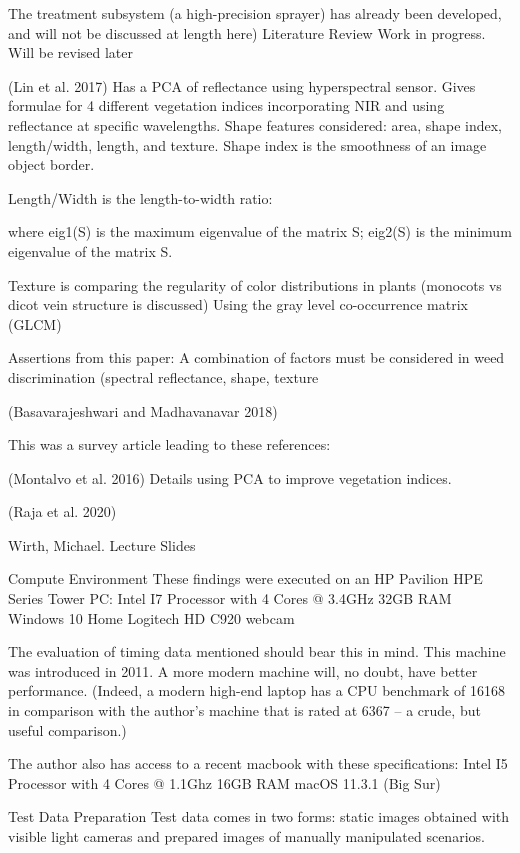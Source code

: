 \documentclass[letterpaper]{article}
\begin{document}
The treatment subsystem (a high-precision sprayer) has already been developed, and will not be discussed at length here)
Literature Review
Work in progress. Will be revised later

(Lin et al. 2017)
Has a PCA of reflectance using hyperspectral sensor.
Gives formulae for 4 different vegetation indices incorporating NIR and using reflectance at specific wavelengths.
Shape features considered: area, shape index, length/width, length, and texture. Shape index is the smoothness of an image object border.

Length/Width is the length-to-width ratio:




where eig1(S) is the maximum eigenvalue of the matrix S; eig2(S) is the minimum eigenvalue of the matrix S.

Texture is comparing the regularity of color distributions in plants  (monocots vs dicot vein structure is discussed) Using the gray level co-occurrence matrix (GLCM)


Assertions from this paper:
A combination of factors must be considered in weed discrimination (spectral reflectance, shape, texture

(Basavarajeshwari and Madhavanavar 2018)

This was a survey article leading to these references:

(Montalvo et al. 2016)
Details using PCA to improve vegetation indices.

(Raja et al. 2020)

Wirth, Michael. Lecture Slides

Compute Environment
These findings were executed on an HP Pavilion HPE Series Tower PC:
Intel I7 Processor with 4 Cores @ 3.4GHz
32GB RAM
Windows 10 Home
Logitech HD C920 webcam

The evaluation of timing data mentioned should bear this in mind. This machine was introduced in 2011. A more modern machine will, no doubt, have better performance. (Indeed, a modern high-end laptop has a CPU benchmark of 16168 in comparison with the author’s machine that is rated at 6367 -- a crude, but useful comparison.)

The author also has access to a recent macbook with these specifications:
Intel I5 Processor with 4 Cores @ 1.1Ghz
16GB RAM
macOS 11.3.1 (Big Sur)

Test Data Preparation
Test data comes in two forms: static images obtained with visible light cameras and prepared images of manually manipulated scenarios.
\end{document}
